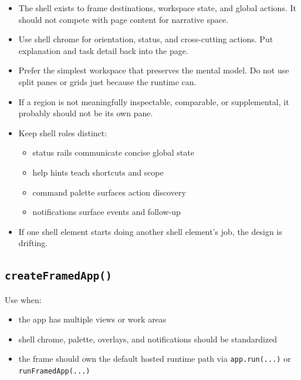 \begin{itemize}
\tightlist
\item
  The shell exists to frame destinations, workspace state, and global actions. It should not compete with page content for narrative space.
\item
  Use shell chrome for orientation, status, and cross-cutting actions. Put explanation and task detail back into the page.
\item
  Prefer the simplest workspace that preserves the mental model. Do not use split panes or grids just because the runtime can.
\item
  If a region is not meaningfully inspectable, comparable, or supplemental, it probably should not be its own pane.
\item
  Keep shell roles distinct:

  \begin{itemize}
  \tightlist
  \item
    status rails communicate concise global state
  \item
    help hints teach shortcuts and scope
  \item
    command palette surfaces action discovery
  \item
    notifications surface events and follow-up
  \end{itemize}
\item
  If one shell element starts doing another shell element's job, the design is drifting.
\end{itemize}

\subsection{\texorpdfstring{\texttt{c\allowbreak{}r\allowbreak{}e\allowbreak{}a\allowbreak{}t\allowbreak{}e\allowbreak{}F\allowbreak{}r\allowbreak{}a\allowbreak{}m\allowbreak{}e\allowbreak{}d\allowbreak{}A\allowbreak{}p\allowbreak{}p\allowbreak{}(\allowbreak{})}}{}}\label{record-023-createframedapp}

Use when:

\begin{itemize}
\tightlist
\item
  the app has multiple views or work areas
\item
  shell chrome, palette, overlays, and notifications should be standardized
\item
  the frame should own the default hosted runtime path via \texttt{a\allowbreak{}p\allowbreak{}p\allowbreak{}.\allowbreak{}r\allowbreak{}u\allowbreak{}n\allowbreak{}(\allowbreak{}.\allowbreak{}.\allowbreak{}.\allowbreak{})} or \texttt{r\allowbreak{}u\allowbreak{}n\allowbreak{}F\allowbreak{}r\allowbreak{}a\allowbreak{}m\allowbreak{}e\allowbreak{}d\allowbreak{}A\allowbreak{}p\allowbreak{}p\allowbreak{}(\allowbreak{}.\allowbreak{}.\allowbreak{}.\allowbreak{})}
\end{itemize}

